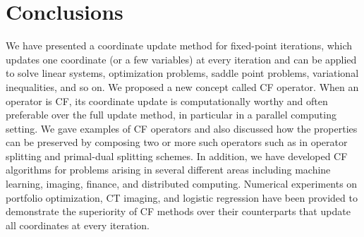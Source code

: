 \section{Conclusions}
We have presented a coordinate update method for fixed-point iterations, which updates one coordinate (or a few variables) at every iteration and can be applied to solve linear systems, optimization problems, saddle point problems, variational inequalities, and so on. We proposed a new concept called CF operator. When an operator is CF, its coordinate update is computationally worthy and often preferable over the full update method, in particular in a parallel computing setting. We gave examples of CF operators and also discussed how the properties can be preserved by composing two or more such operators such as in operator splitting and primal-dual splitting schemes. In addition, we have developed CF algorithms for problems arising in several different areas including machine learning, imaging, finance, and distributed computing. Numerical experiments on portfolio optimization, CT imaging, and logistic regression have been provided to demonstrate the superiority of CF methods over their counterparts that update all coordinates at every iteration. 

